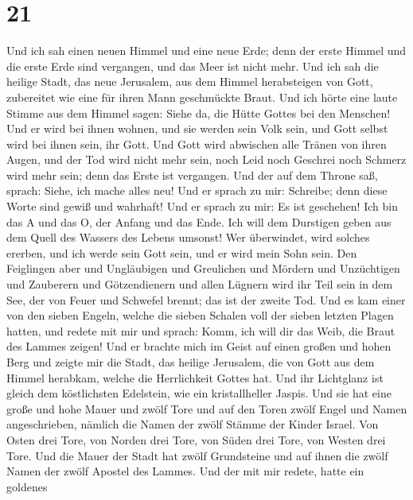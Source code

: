 \hypertarget{section-20}{%
\section{21}\label{section-20}}

 Und ich sah einen neuen Himmel und eine neue Erde; denn
der erste Himmel und die erste Erde sind vergangen, und das Meer ist
nicht mehr.  Und ich sah die heilige Stadt, das neue
Jerusalem, aus dem Himmel herabsteigen von Gott, zubereitet wie eine für
ihren Mann geschmückte Braut.  Und ich hörte eine laute
Stimme aus dem Himmel sagen: Siehe da, die Hütte Gottes bei den
Menschen! Und er wird bei ihnen wohnen, und sie werden sein Volk sein,
und Gott selbst wird bei ihnen sein, ihr Gott.  Und Gott
wird abwischen alle Tränen von ihren Augen, und der Tod wird nicht mehr
sein, noch Leid noch Geschrei noch Schmerz wird mehr sein; denn das
Erste ist vergangen.  Und der auf dem Throne saß, sprach:
Siehe, ich mache alles neu! Und er sprach zu mir: Schreibe; denn diese
Worte sind gewiß und wahrhaft!  Und er sprach zu mir: Es
ist geschehen! Ich bin das A und das O, der Anfang und das Ende. Ich
will dem Durstigen geben aus dem Quell des Wassers des Lebens umsonst!
 Wer überwindet, wird solches ererben, und ich werde sein
Gott sein, und er wird mein Sohn sein.  Den Feiglingen
aber und Ungläubigen und Greulichen und Mördern und Unzüchtigen und
Zauberern und Götzendienern und allen Lügnern wird ihr Teil sein in dem
See, der von Feuer und Schwefel brennt; das ist der zweite Tod.
 Und es kam einer von den sieben Engeln, welche die sieben
Schalen voll der sieben letzten Plagen hatten, und redete mit mir und
sprach: Komm, ich will dir das Weib, die Braut des Lammes zeigen!
 Und er brachte mich im Geist auf einen großen und hohen
Berg und zeigte mir die Stadt, das heilige Jerusalem, die von Gott aus
dem Himmel herabkam,  welche die Herrlichkeit Gottes hat.
Und ihr Lichtglanz ist gleich dem köstlichsten Edelstein, wie ein
kristallheller Jaspis.  Und sie hat eine große und hohe
Mauer und zwölf Tore und auf den Toren zwölf Engel und Namen
angeschrieben, nämlich die Namen der zwölf Stämme der Kinder Israel.
 Von Osten drei Tore, von Norden drei Tore, von Süden
drei Tore, von Westen drei Tore.  Und die Mauer der Stadt
hat zwölf Grundsteine und auf ihnen die zwölf Namen der zwölf Apostel
des Lammes.  Und der mit mir redete, hatte ein goldenes
